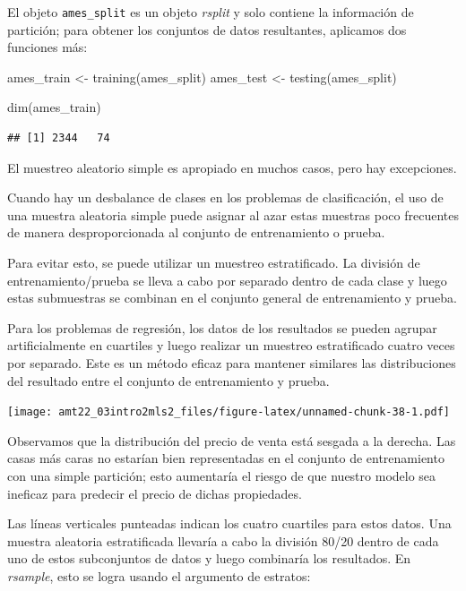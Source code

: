 \documentclass[
]{book}
\newenvironment{Shaded}{\begin{snugshade}}{\end{snugshade}}
\newcommand{\FunctionTok}[1]{\textcolor[rgb]{0.00,0.00,0.00}{#1}}
\newcommand{\NormalTok}[1]{#1}
\newcommand{\OtherTok}[1]{\textcolor[rgb]{0.56,0.35,0.01}{#1}}
\begin{document}
El objeto \texttt{ames\_split} es un objeto \emph{rsplit} y solo contiene la información de partición; para obtener los conjuntos de datos resultantes, aplicamos dos funciones más:

\begin{Shaded}
\begin{Highlighting}[]
\NormalTok{ames\_train }\OtherTok{\textless{}{-}} \FunctionTok{training}\NormalTok{(ames\_split)}
\NormalTok{ames\_test  }\OtherTok{\textless{}{-}}  \FunctionTok{testing}\NormalTok{(ames\_split)}

\FunctionTok{dim}\NormalTok{(ames\_train)}
\end{Highlighting}
\end{Shaded}

\begin{verbatim}
## [1] 2344   74
\end{verbatim}

El muestreo aleatorio simple es apropiado en muchos casos, pero hay excepciones.

Cuando hay un desbalance de clases en los problemas de clasificación, el uso de una muestra aleatoria simple puede asignar al azar estas muestras poco frecuentes de manera desproporcionada al conjunto de entrenamiento o prueba.

Para evitar esto, se puede utilizar un muestreo estratificado. La división de entrenamiento/prueba se lleva a cabo por separado dentro de cada clase y luego estas submuestras se combinan en el conjunto general de entrenamiento y prueba.

Para los problemas de regresión, los datos de los resultados se pueden agrupar artificialmente en cuartiles y luego realizar un muestreo estratificado cuatro veces por separado. Este es un método eficaz para mantener similares las distribuciones del resultado entre el conjunto de entrenamiento y prueba.

\texttt{[image: amt22\_03intro2mls2\_files/figure-latex/unnamed-chunk-38-1.pdf]}

Observamos que la distribución del precio de venta está sesgada a la derecha.
Las casas más caras no estarían bien representadas en el conjunto de entrenamiento con una simple partición; esto aumentaría el riesgo de que nuestro modelo sea ineficaz para predecir el precio de dichas propiedades.

Las líneas verticales punteadas indican los cuatro cuartiles para estos datos.
Una muestra aleatoria estratificada llevaría a cabo la división 80/20 dentro de cada uno de estos subconjuntos de datos y luego combinaría los resultados. En \emph{rsample}, esto se logra usando el argumento de estratos:
\end{document}
